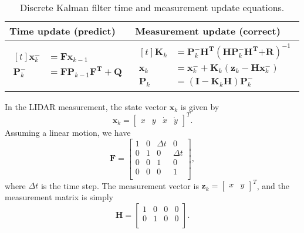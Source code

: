 \documentclass[12pt]{article}
\begin{document}
\begin{table}[h]
	\renewcommand{\arraystretch}{1.5}
	\caption{Discrete Kalman filter time and measurement update equations.}
	\centering
	\label{tab:table-KF}
	\begin{tabular}{C{7cm}|C{7cm}}
		\hline
		Time update (predict) & Measurement update (correct) \\
		\hline
		$\begin{aligned}[t]
			\mathbf{x}_{k}^{-} &= \mathbf{F}\mathbf{x}_{k - 1} \\
			\mathbf{P}_{k}^{-} &= \mathbf{F}\mathbf{P}_{k - 1}\mathbf{F}^{\mathbf{T}} + \mathbf{Q}
		\end{aligned}$ &
		$\begin{aligned}[t]
			\mathbf{K}_{k} &= \mathbf{P}_{k}^{-}\mathbf{H}^{\mathbf{T}}( \mathbf{H}\mathbf{P}_{k}^{-}\mathbf{H}^{\mathbf{T}}\mathbf{+ R})^{- 1} \\
			\mathbf{x}_{k} &= \mathbf{x}_{k}^{-} + \mathbf{K}_{k}( \mathbf{z}_{k} - \mathbf{H}\mathbf{x}_{k}^{-}) \\
			\mathbf{P}_{k} &= ( \mathbf{I} - \mathbf{K}_{k}\mathbf{H})\mathbf{P}_{k}^{-}
		\end{aligned}$ \\
		\hline
	\end{tabular}
\end{table}

In the LIDAR measurement, the state vector \(\mathbf{x}_{k}\) is given by
%
\begin{equation}
	\mathbf{x}_{k} = \begin{bmatrix}x & y & \dot{x} & \dot{y}\end{bmatrix}^{T}.
\end{equation}
%
Assuming a linear motion, we have
%
\begin{equation}
	\mathbf{F} = \begin{bmatrix}
	1 & 0 & \Delta t & 0 \\
	0 & 1 & 0 & \Delta t \\
	0 & 0 & 1 & 0 \\
	0 & 0 & 0 & 1 \\
	\end{bmatrix},
\end{equation}
%
where \(\Delta t\) is the time step. The measurement vector is \(\mathbf{z}_{k} = \begin{bmatrix} x & y \end{bmatrix}^{T}\), and the measurement matrix is simply
%
\begin{equation}
	\mathbf{H} = \begin{bmatrix}
	1 & 0 & 0 & 0 \\
	0 & 1 & 0 & 0 \\
	\end{bmatrix}.
\end{equation}
\end{document}
